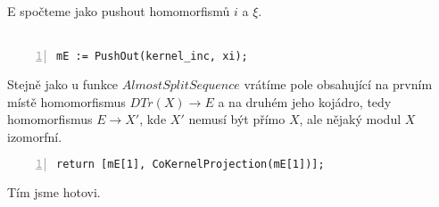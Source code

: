         E spočteme jako pushout homomorfismů $i$ a $\xi$. \\\\
        \centerline{  }
        
      \begin{Verbatim}[frame=single,numbers=left]
mE := PushOut(kernel_inc, xi);
      \end{Verbatim}
      
      Stejně jako u funkce $AlmostSplitSequence$ vrátíme pole obsahující na 
      prvním místě  homomorfismus $DTr(X)\to E$ a na druhém jeho kojádro, 
       tedy homomorfismus $E\to X'$, kde $X'$ nemusí být přímo $X$, 
      ale nějaký modul $X$ izomorfní. 
      
      \begin{Verbatim}[frame=single,numbers=left]
return [mE[1], CoKernelProjection(mE[1])];
      \end{Verbatim} 
      
      \begin{description}
        \item[Tím jsme hotovi.]
      \end{description}
      
    







